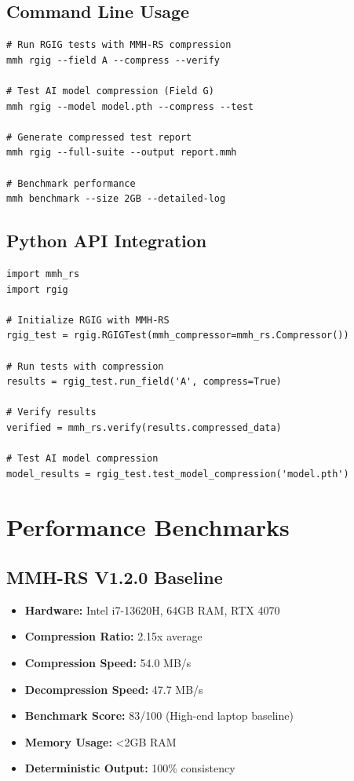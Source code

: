 \documentclass[11pt]{article}
\begin{document}
\subsection*{Command Line Usage}
\begin{verbatim}
# Run RGIG tests with MMH-RS compression
mmh rgig --field A --compress --verify

# Test AI model compression (Field G)
mmh rgig --model model.pth --compress --test

# Generate compressed test report
mmh rgig --full-suite --output report.mmh

# Benchmark performance
mmh benchmark --size 2GB --detailed-log
\end{verbatim}

\subsection*{Python API Integration}
\begin{verbatim}
import mmh_rs
import rgig

# Initialize RGIG with MMH-RS
rgig_test = rgig.RGIGTest(mmh_compressor=mmh_rs.Compressor())

# Run tests with compression
results = rgig_test.run_field('A', compress=True)

# Verify results
verified = mmh_rs.verify(results.compressed_data)

# Test AI model compression
model_results = rgig_test.test_model_compression('model.pth')
\end{verbatim}

\section*{Performance Benchmarks}

\subsection*{MMH-RS V1.2.0 Baseline}
\begin{itemize}
  \item \textbf{Hardware:} Intel i7-13620H, 64GB RAM, RTX 4070
  \item \textbf{Compression Ratio:} 2.15x average
  \item \textbf{Compression Speed:} 54.0 MB/s
  \item \textbf{Decompression Speed:} 47.7 MB/s
  \item \textbf{Benchmark Score:} 83/100 (High-end laptop baseline)
  \item \textbf{Memory Usage:} <2GB RAM
  \item \textbf{Deterministic Output:} 100\% consistency
\end{itemize}
\end{document}
